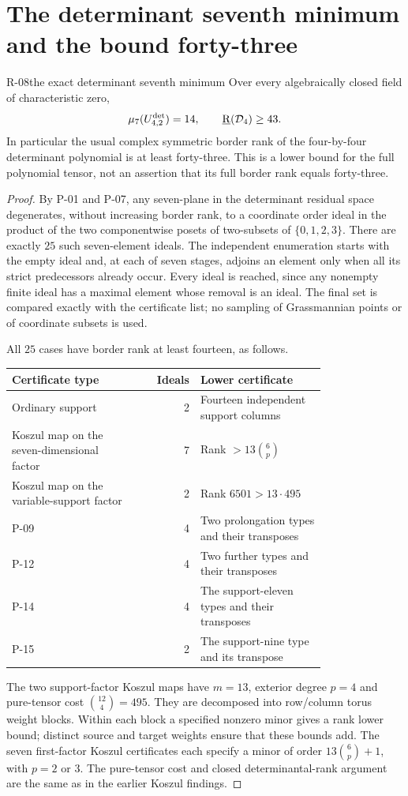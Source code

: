 \section{The determinant seventh minimum and the bound forty-three}

\begin{finding}{R-08}{the exact determinant seventh minimum}
Over every algebraically closed field of characteristic zero,
\[
 \mu_7(U^{\det}_{4,2})=14,\qquad
 \underline{\mathrm R}(\mathcal D_4)\geq43.
\]
In particular the usual complex symmetric border rank of the
four-by-four determinant polynomial is at least forty-three.
This is a lower bound for the full polynomial tensor, not an
assertion that its full border rank equals forty-three.
\end{finding}
\begin{proof}
By P-01 and P-07, any seven-plane in the determinant residual
space degenerates, without increasing border rank, to a
coordinate order ideal in the product of the two componentwise
posets of two-subsets of $\{0,1,2,3\}$. There are exactly
$25$ such seven-element ideals. The independent enumeration
starts with the empty ideal and, at each of seven stages,
adjoins an element only when all its strict predecessors
already occur. Every ideal is reached, since any nonempty
finite ideal has a maximal element whose removal is an ideal.
The final set is compared exactly with the certificate list;
no sampling of Grassmannian points or of coordinate subsets
is used.

All $25$ cases have border rank at least fourteen, as follows.
\begin{center}
\begin{tabular}{p{0.39\linewidth}|r|p{0.40\linewidth}}
Certificate type&Ideals&Lower certificate\\\hline
Ordinary support&2&Fourteen independent support columns\\
Koszul map on the seven-dimensional factor&7&Rank $>13\binom6p$\\
Koszul map on the variable-support factor&2&Rank $6501>13\cdot495$\\
P-09&4&Two prolongation types and their transposes\\
P-12&4&Two further types and their transposes\\
P-14&4&The support-eleven types and their transposes\\
P-15&2&The support-nine type and its transpose
\end{tabular}
\end{center}
The two support-factor Koszul maps have $m=13$, exterior
degree $p=4$ and pure-tensor cost $\binom{12}4=495$.
They are decomposed into row/column torus weight blocks.
Within each block a specified nonzero minor gives a rank
lower bound; distinct source and target weights ensure
that these bounds add. The seven first-factor Koszul
certificates each specify a minor of order
$13\binom6p+1$, with $p=2$ or $3$.
The pure-tensor cost and closed determinantal-rank argument
are the same as in the earlier Koszul findings.


\end{proof}
